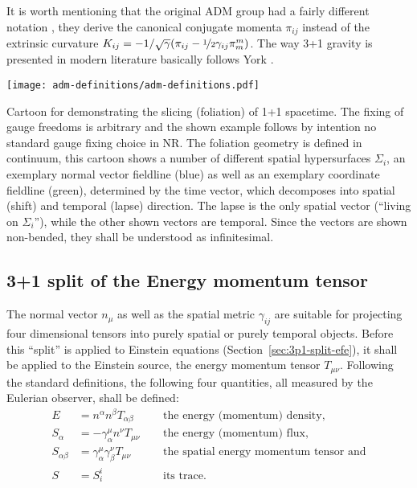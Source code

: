 It is worth mentioning that the original ADM group had a fairly different 
notation \cite{Gourgoulhon2012}, they derive the canonical conjugate momenta 
$\pi_{ij}$ instead of the extrinsic curvature $K_{ij} = 
-1/\sqrt{\gamma}(\pi_{ij} -
 \nicefrac 12 \gamma_{ij}\pi^m_m)$. The way 3+1 gravity is presented
in modern literature basically follows York \cite{York79}.

\begin{marginfigure}
	\texttt{[image: adm-definitions/adm-definitions.pdf]}
	\caption[
	ADM definitions, drawn with Inkscape, \exclusive
	]{
		Cartoon for
		demonstrating the slicing (foliation) of 1+1 spacetime.
		The fixing of gauge freedoms is arbitrary and the shown example
		follows by intention no standard gauge fixing choice in NR.
		The foliation geometry is defined in continuum, this cartoon
		shows a number of different spatial hypersurfaces $\Sigma_i$,
		an exemplary normal vector fieldline (blue) 
		as well as an exemplary coordinate fieldline (green), determined
		by the time vector, which decomposes into spatial (shift) and
		temporal (lapse) direction. The lapse is the only spatial vector
		(``living on $\Sigma_i$''), while the other shown vectors are
		temporal. Since the vectors are shown non-bended, they shall be
		understood as infinitesimal.
	}
	\label{fig:efe-intro-2body-paramspace}
\end{marginfigure}%

\subsection*{3+1 split of the Energy momentum tensor}\label{sec.3p1-emtensor}
The normal vector $n_\mu$ as well as the spatial metric $\gamma_{ij}$ are
suitable for projecting four dimensional tensors into purely spatial or
purely temporal objects. Before this ``split'' is applied to Einstein equations
(Section~\ref{sec:3p1-split-efe}), it shall be applied to the Einstein source,
\ie the energy momentum tensor $T_{\mu\nu}$. Following the standard definitions,
the following four quantities, all measured by the Eulerian observer, shall be
defined:
\begin{align}
\label{eq:smunu.E}
E&=n^\alpha n^\beta T_{\alpha\beta}
\quad&&\text{the energy (momentum) density,}
\\
\label{eq:smunu.Si}
S_\alpha &= -\gamma^\mu_\alpha n^\nu T_{\mu\nu}
~~&&\text{the energy (momentum) flux,}
\\
\label{eq:smunu.Sij}
S_{\alpha\beta} &= \gamma^\mu_\alpha \gamma^\nu_\beta T_{\mu\nu}
\quad&&\text{the spatial energy momentum tensor and}
\\
S &= S^i_i 
\quad&&\text{its trace.}
\end{align}

